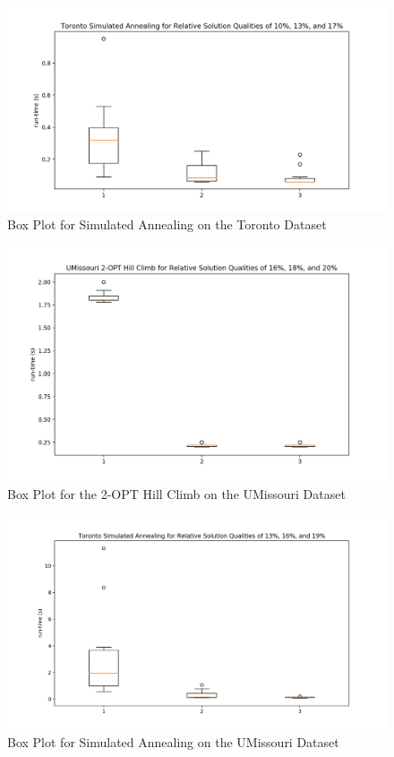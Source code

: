 \documentclass[format=sigconf]{acmart}
\begin{document}
\begin{figure}[htbp]
    \centerline{\includegraphics[scale=.5]{graphs/Toronto_LS2_Box.png}}
    \caption{Box Plot for Simulated Annealing on the Toronto Dataset}
    \label{fig:10}
\end{figure}

\begin{figure}[htbp]
    \centerline{\includegraphics[scale=.5]{graphs/UMissouri_LS1_Box.png}}
    \caption{Box Plot for the 2-OPT Hill Climb on the UMissouri Dataset}
    \label{fig11}
\end{figure}

\begin{figure}[htbp]
    \centerline{\includegraphics[scale=.5]{graphs/UMissouri_LS2_Box.png}}
    \caption{Box Plot for Simulated Annealing on the UMissouri Dataset}
    \label{fig12}
\end{figure}
 \clearpage
\end{document}
